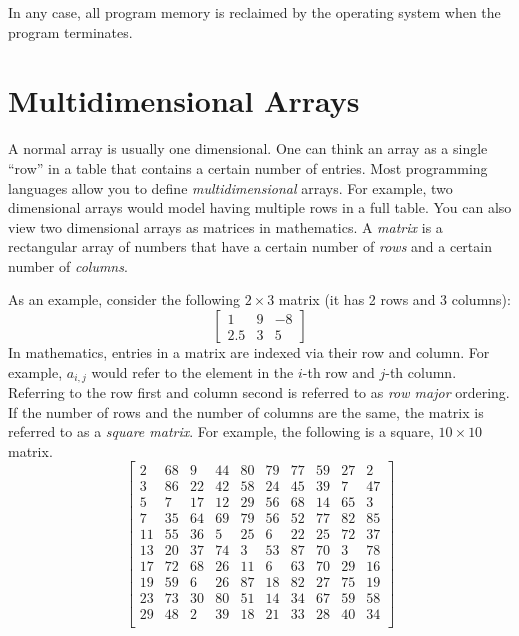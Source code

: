 In any case, all program memory is reclaimed by 
the operating system when the program terminates.

\section{Multidimensional Arrays}

A normal array is usually one dimensional.  One can think an array
as a single ``row'' in a table that contains a certain number of entries.
Most programming languages allow you to define \emph{multidimensional}
arrays.  For example, two dimensional arrays would model having
multiple rows in a full table.  You can also view two dimensional 
arrays as matrices in mathematics.  A \emph{matrix} is a rectangular
array of numbers that have a certain number of \emph{rows} and
a certain number of \emph{columns}.  

As an example, consider the following $2 \times 3$ matrix (it has
2 rows and 3 columns):
\[
\begin{bmatrix}
1 & 9 & -8 \\
2.5 & 3 & 5
\end{bmatrix}
\]
In mathematics, entries in a matrix are indexed via their row and column.
For example, $a_{i,j}$ would refer to the element in the $i$-th row and
$j$-th column.  Referring to the row first and column second is referred
to as \emph{row major} ordering.  If the number of rows and the number
of columns are the same, the matrix is referred to as a \emph{square matrix}.
For example, the following is a square, $10 \times 10$ matrix.
$$\left[ \begin{array}{cccccccccc}
 2 & 68 &  9 & 44 & 80 & 79 & 77 & 59 & 27 &  2 \\
 3 & 86 & 22 & 42 & 58 & 24 & 45 & 39 &  7 & 47 \\
 5 &  7 & 17 & 12 & 29 & 56 & 68 & 14 & 65 &  3 \\
 7 & 35 & 64 & 69 & 79 & 56 & 52 & 77 & 82 & 85 \\
11 & 55 & 36 &  5 & 25 &  6 & 22 & 25 & 72 & 37 \\
13 & 20 & 37 & 74 &  3 & 53 & 87 & 70 &  3 & 78 \\
17 & 72 & 68 & 26 & 11 &  6 & 63 & 70 & 29 & 16 \\
19 & 59 &  6 & 26 & 87 & 18 & 82 & 27 & 75 & 19 \\
23 & 73 & 30 & 80 & 51 & 14 & 34 & 67 & 59 & 58 \\
29 & 48 &  2 & 39 & 18 & 21 & 33 & 28 & 40 & 34 \\
\end{array} \right]$$

